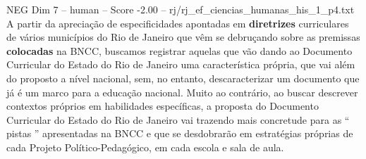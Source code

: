 \begin{textsample}{NEG Dim 7 – human – Score -2.00 – rj/rj\_ef\_ciencias\_humanas\_his\_1\_p4.txt}  \label{ex:f7_neg_010}
A partir da apreciação de especificidades apontadas em \textbf{diretrizes} curriculares de vários municípios do Rio de Janeiro que vêm se debruçando sobre as premissas \textbf{colocadas} na BNCC, buscamos registrar aquelas que vão dando ao Documento Curricular do Estado do Rio de Janeiro uma característica própria, que vai além do proposto a nível nacional, sem, no entanto, descaracterizar um documento que já é um marco para a educação nacional.
Muito ao contrário, ao buscar descrever contextos próprios em habilidades específicas, a proposta do Documento Curricular do Estado do Rio de Janeiro vai trazendo mais concretude para as “ pistas ” apresentadas na BNCC e que se desdobrarão em estratégias próprias de cada Projeto Político-Pedagógico, em cada escola e sala de aula.

\end{textsample}
